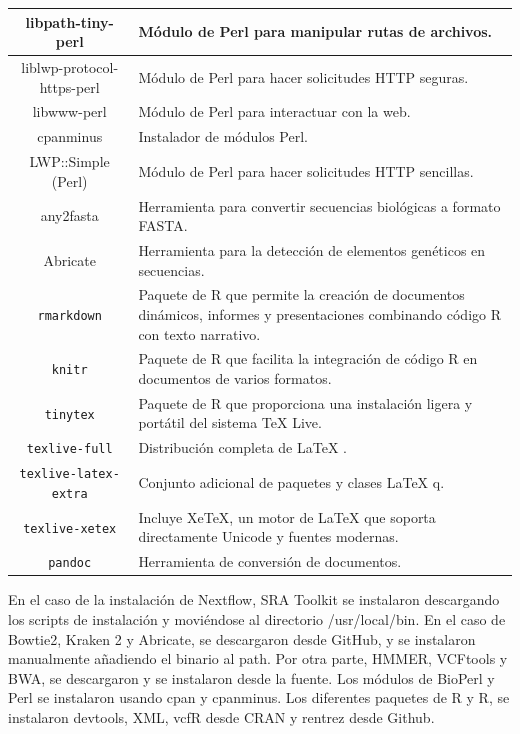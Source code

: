 \documentclass[12pt]{article}
\begin{document}
\begin{longtable}{|c|p{6cm}|}
    \hline
    libpath-tiny-perl & Módulo de Perl para manipular rutas de archivos. \\
    \hline
    liblwp-protocol-https-perl & Módulo de Perl para hacer solicitudes HTTP seguras. \\
    \hline
    libwww-perl & Módulo de Perl para interactuar con la web. \\
    \hline
    cpanminus & Instalador de módulos Perl. \\
    \hline
    LWP::Simple (Perl) & Módulo de Perl para hacer solicitudes HTTP sencillas. \\
    \hline
    any2fasta & Herramienta para convertir secuencias biológicas a formato FASTA. \\
    \hline
    Abricate & Herramienta para la detección de elementos genéticos en secuencias. \\
    \hline
    \texttt{rmarkdown} & Paquete de R que permite la creación de documentos dinámicos, informes y presentaciones combinando código R con texto narrativo. \\
    \hline
    \texttt{knitr} & Paquete de R que facilita la integración de código R en documentos de varios formatos. \\
    \hline
    \texttt{tinytex} & Paquete de R que proporciona una instalación ligera y portátil del sistema TeX Live. \\
    \hline
    \texttt{texlive-full} & Distribución completa de LaTeX . \\
    \hline
    \texttt{texlive-latex-extra} & Conjunto adicional de paquetes y clases LaTeX q. \\
    \hline
    \texttt{texlive-xetex} & Incluye XeTeX, un motor de LaTeX que soporta directamente Unicode y fuentes modernas. \\
    \hline
    \texttt{pandoc} & Herramienta de conversión de documentos. \\
    \hline
\end{longtable}

En el caso de la instalación de Nextflow, SRA Toolkit se instalaron descargando 
los scripts de instalación y moviéndose al directorio /usr/local/bin. En el caso de Bowtie2, 
Kraken 2 y Abricate, se descargaron desde GitHub, y se instalaron manualmente añadiendo el 
binario al path. Por otra parte, HMMER, VCFtools y BWA, se descargaron y se instalaron 
desde la fuente. Los módulos de BioPerl y Perl se instalaron usando cpan y cpanminus. Los 
diferentes paquetes de R y R, se instalaron devtools, XML, vcfR desde CRAN y rentrez desde 
Github.
\end{document}
